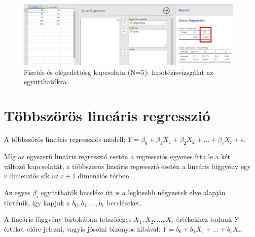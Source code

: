 \documentclass[
  letterpaper,
]{krantz}
\makeatletter
\newenvironment{Shaded}{\begin{snugshade}}{\end{snugshade}}
\newcommand{\AttributeTok}[1]{\textcolor[rgb]{0.40,0.45,0.13}{#1}}
\newcommand{\CommentTok}[1]{\textcolor[rgb]{0.37,0.37,0.37}{#1}}
\newcommand{\FunctionTok}[1]{\textcolor[rgb]{0.28,0.35,0.67}{#1}}
\newcommand{\NormalTok}[1]{\textcolor[rgb]{0.00,0.23,0.31}{#1}}
\newcommand{\OtherTok}[1]{\textcolor[rgb]{0.00,0.23,0.31}{#1}}
\newcommand{\SpecialCharTok}[1]{\textcolor[rgb]{0.37,0.37,0.37}{#1}}
\newcommand{\StringTok}[1]{\textcolor[rgb]{0.13,0.47,0.30}{#1}}
\newenvironment{kframe}{%
\medskip{}
\setlength{\fboxsep}{.8em}
 \def\at@end@of@kframe{}%
 \ifinner\ifhmode%
  \def\at@end@of@kframe{\end{minipage}}%
  \begin{minipage}{\columnwidth}%
 \fi\fi%
 \def\FrameCommand##1{\hskip\@totalleftmargin \hskip-\fboxsep
 \colorbox{shadecolor}{##1}\hskip-\fboxsep
     \hskip-\linewidth \hskip-\@totalleftmargin \hskip\columnwidth}%
 \MakeFramed {\advance\hsize-\width
   \@totalleftmargin\z@ \linewidth\hsize
   \@setminipage}}%
 {\par\unskip\endMakeFramed%
 \at@end@of@kframe}
\renewenvironment{Shaded}{\begin{kframe}}{\end{kframe}}
\makeatother
\begin{document}
\begin{figure}

{\centering \includegraphics{./images/lin_reg_fizetes_elegedettseg_02_kep_02.jpg}

}

\caption{Fizetés és elégedettésg kapcsolata (N=5): hipotézisvizsgálat az
együtthatókra}

\end{figure}

\hypertarget{tuxf6bbszuxf6ruxf6s-lineuxe1ris-regressziuxf3}{%
\section{Többszörös lineáris
regresszió}\label{tuxf6bbszuxf6ruxf6s-lineuxe1ris-regressziuxf3}}

A többszörös lineáris regressziós modell:
\(Y=\beta_0+\beta_1 X_1+\beta_2 X_2+\dots + \beta_r X_r+\epsilon\).

Míg az egyszerű lineáris regresszió esetén a regressziós egyenes írta le
a két változó kapcsolatát, a többszörös lineáris regresszió esetén a
lineáris függvény egy \(r\) dimenziós sík az \(r+1\) dimenziós térben.

Az egyes \(\beta_i\) együtthatók becslése itt is a legkisebb négyzetek
elve alapján történik, így kapjuk a \(b_0, b_1, \dots, b_r\)
becsléseket.

A lineáris függvény birtokában tetszőleges \(X_1,X_2,\dots,X_r\)
értékekhez tudunk \(Y\) értéket előre jelezni, vagyis jósolni bizonyos
hibával: \(\hat{Y}=b_0+b_1 X_1+\dots+ b_r X_r\).

\begin{Shaded}
\end{Shaded}
\end{document}
